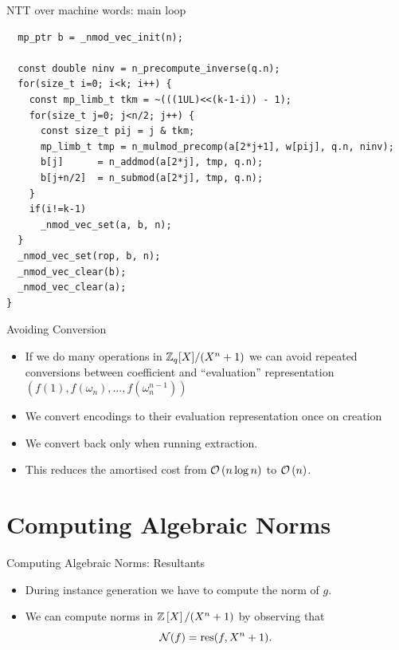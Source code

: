 \documentclass[presentation,smaller]{beamer}
\begin{document}
\begin{frame}[fragile,label={sec:orgheadline17}]{NTT over machine words: main loop}
 \lstset{language=C,label= ,caption= ,captionpos=b,numbers=none}
\begin{lstlisting}
  mp_ptr b = _nmod_vec_init(n);

  const double ninv = n_precompute_inverse(q.n);
  for(size_t i=0; i<k; i++) {
    const mp_limb_t tkm = ~(((1UL)<<(k-1-i)) - 1);
    for(size_t j=0; j<n/2; j++) {
      const size_t pij = j & tkm;
      mp_limb_t tmp = n_mulmod_precomp(a[2*j+1], w[pij], q.n, ninv);
      b[j]      = n_addmod(a[2*j], tmp, q.n);
      b[j+n/2]  = n_submod(a[2*j], tmp, q.n);
    }
    if(i!=k-1)
      _nmod_vec_set(a, b, n);
  }
  _nmod_vec_set(rop, b, n);
  _nmod_vec_clear(b);
  _nmod_vec_clear(a);
}
\end{lstlisting}
\end{frame}

\begin{frame}[label={sec:orgheadline18}]{Avoiding Conversion}
\begin{itemize}
\item If we do many operations in \(\Zq[X]/(\cycf)\) we can avoid repeated conversions between coefficient and “evaluation” representation \(\left(f(1),f(ω_n),\dots,f(ω_n^{n-1})\right)\)
\item We convert encodings to their evaluation representation once on creation
\item We convert back only when running extraction.
\item This reduces the amortised cost from \(\mathcal{O}\left( {n \log n} \right)\) to \(\mathcal{O}\left( {n} \right)\).
\end{itemize}
\end{frame}


\section{Computing Algebraic Norms}
\label{sec:orgheadline25}

\begin{frame}[label={sec:orgheadline20}]{Computing Algebraic Norms: Resultants}
\begin{itemize}
\item During instance generation we have to compute the norm of \(g\).
\item We can compute norms in \(\Z[X]/(\cycf)\) by observing that \[\mathcal{N}({f}) = \operatorname{res}(f,X^n+1).\]
\end{itemize}

\end{frame}
\end{document}

